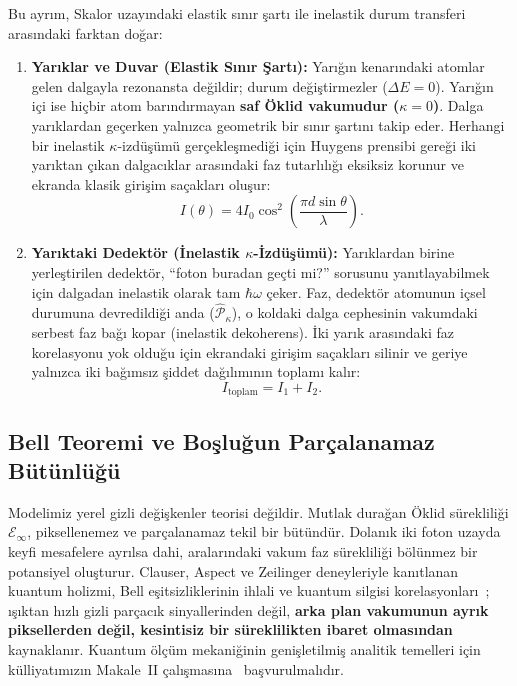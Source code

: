 Bu ayrım, Skalor uzayındaki elastik sınır şartı ile inelastik durum transferi arasındaki farktan doğar:
\begin{enumerate}
    \item \textbf{Yarıklar ve Duvar (Elastik Sınır Şartı):} Yarığın kenarındaki atomlar gelen dalgayla rezonansta değildir; durum değiştirmezler ($\Delta E = 0$). Yarığın içi ise hiçbir atom barındırmayan \textbf{saf Öklid vakumudur ($\kappa = 0$)}. Dalga yarıklardan geçerken yalnızca geometrik bir sınır şartını takip eder. Herhangi bir inelastik $\kappa$-izdüşümü gerçekleşmediği için Huygens prensibi gereği iki yarıktan çıkan dalgacıklar arasındaki faz tutarlılığı eksiksiz korunur ve ekranda klasik girişim saçakları oluşur:
          \begin{equation}
              I(\theta) = 4 I_0 \cos^2\left( \frac{\pi d \sin\theta}{\lambda} \right).
              \label{eq:girisim_sacagi_main}
          \end{equation}
    \item \textbf{Yarıktaki Dedektör (İnelastik $\kappa$-İzdüşümü):} Yarıklardan birine yerleştirilen dedektör, ``foton buradan geçti mi?'' sorusunu yanıtlayabilmek için dalgadan inelastik olarak tam $\hbar\omega$ çeker. Faz, dedektör atomunun içsel durumuna devredildiği anda ($\hat{\mathcal{P}}_\kappa$), o koldaki dalga cephesinin vakumdaki serbest faz bağı kopar (inelastik dekoherens). İki yarık arasındaki faz korelasyonu yok olduğu için ekrandaki girişim saçakları silinir ve geriye yalnızca iki bağımsız şiddet dağılımının toplamı kalır:
          \begin{equation}
              I_{\mathrm{toplam}} = I_1 + I_2.
              \label{eq:klasik_toplam}
          \end{equation}
\end{enumerate}

\subsection{Bell Teoremi ve Boşluğun Parçalanamaz Bütünlüğü}
\label{sec:bell_ve_nonlokalite}

Modelimiz yerel gizli değişkenler teorisi değildir. Mutlak durağan Öklid sürekliliği $\mathcal{E}_\infty$, piksellenemez ve parçalanamaz tekil bir bütündür. Dolanık iki foton uzayda keyfi mesafelere ayrılsa dahi, aralarındaki vakum faz sürekliliği bölünmez bir potansiyel oluşturur. Clauser, Aspect ve Zeilinger deneyleriyle kanıtlanan kuantum holizmi, Bell eşitsizliklerinin ihlali ve kuantum silgisi korelasyonları~\cite{scully1982,kim2000}; ışıktan hızlı gizli parçacık sinyallerinden değil, \textbf{arka plan vakumunun ayrık piksellerden değil, kesintisiz bir süreklilikten ibaret olmasından} kaynaklanır. Kuantum ölçüm mekaniğinin genişletilmiş analitik temelleri için külliyatımızın Makale~II çalışmasına~\cite{haydari_calculus} başvurulmalıdır.
